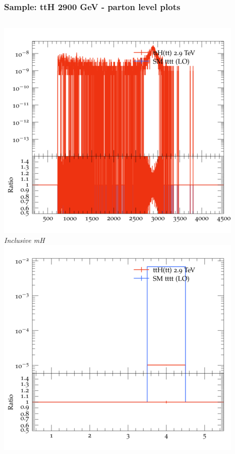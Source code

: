 \documentclass{beamer}
\begin{document}
\begin{frame}
\frametitle{Sample: ttH 2900 GeV - parton level plots}
\begin{columns}
\includegraphics[width=\textwidth]{../plots/ttH_2900/tttt_ttH/Inclusive_mH.png}\\
\textit{\small Inclusive mH}
\includegraphics[width=\textwidth]{../plots/ttH_2900/tttt_ttH/Inclusive_nTop.png}\\

\end{columns}
\end{frame}
\end{document}
